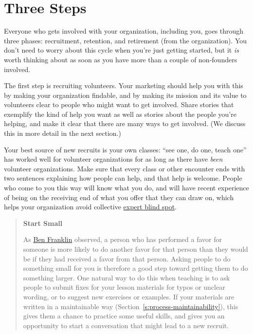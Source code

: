 \section{Three Steps}\label{s:community-three-steps}

Everyone who gets involved with your organization, including you, goes
through three phases: recruitment, retention, and retirement (from the
organization). You don't need to worry about this cycle when you're just
getting started, but it \emph{is} worth thinking about as soon as you have
more than a couple of non-founders involved.

The first step is recruiting volunteers. Your marketing should help you
with this by making your organization findable, and by making its
mission and its value to volunteers clear to people who might want to
get involved. Share stories that exemplify the kind of help you want as
well as stories about the people you're helping, and make it clear that
there are many ways to get involved. (We discuss this in more detail in
the next section.)

Your best source of new recruits is your own classes: ``see one, do one,
teach one'' has worked well for volunteer organizations for as long as
there have \emph{been} volunteer organizations. Make sure that every class or
other encounter ends with two sentences explaining how people can help,
and that help is welcome. People who come to you this way will know what
you do, and will have recent experience of being on the receiving end of
what you offer that they can draw on, which helps your organization
avoid collective \protect\hyperlink{g:expert-blind-spot}{expert blind spot}.

\begin{quote}\setlength{\parindent}{0pt}
\textbf{Start Small}

As \href{https://en.wikipedia.org/wiki/Ben_Franklin_effect}{Ben Franklin} observed, a person who has
performed a favor for someone is more likely to do another favor for
that person than they would be if they had received a favor from
that person. Asking people to do something small for you is
therefore a good step toward getting them to do something
larger. One natural way to do this when teaching is to ask people to
submit fixes for your lesson materials for typos or unclear wording,
or to suggest new exercises or examples. If your materials are
written in a maintainable way
(Section~\ref{s:process-maintainability}), this gives them a chance to
practice some useful skills, and gives you an opportunity to start a
conversation that might lead to a new recruit.
\end{quote}

